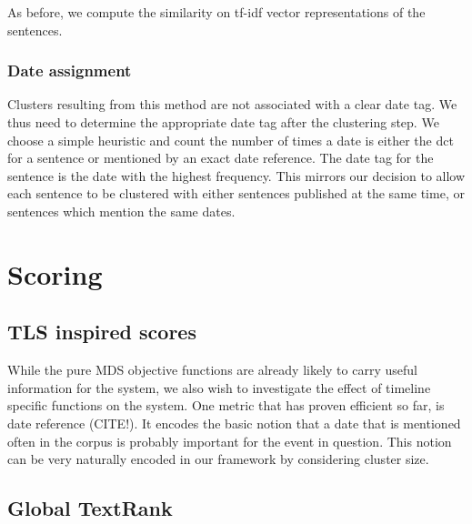 \documentclass[a4paper,BCOR=10mm]{report}
\begin{document}
As before, we compute the similarity on tf-idf vector representations of the sentences.

\subsubsection{Date assignment}

Clusters resulting from this method are not associated with a clear date tag. We thus need to determine the appropriate date tag after the clustering step. We choose a simple heuristic and count the number of times a date is either the dct for a sentence or mentioned by an exact date reference. The date tag for the sentence is the date with the highest frequency. This mirrors our decision to allow each sentence to be clustered with either sentences published at the same time, or sentences which mention the same dates.




\section{Scoring} \label{sec:scoring}

\subsection{TLS inspired scores} \label{sec:tls-scores}

While the pure MDS objective functions are already likely to carry useful information for the system, we also wish to investigate the effect of timeline specific functions on the system.
One metric that has proven efficient so far, is date reference (CITE!). It encodes the basic notion that a date that is mentioned often in the corpus is probably important for the event in question.
This notion can be very naturally encoded in our framework by considering cluster size. %


\subsection{Global TextRank}
\end{document}
